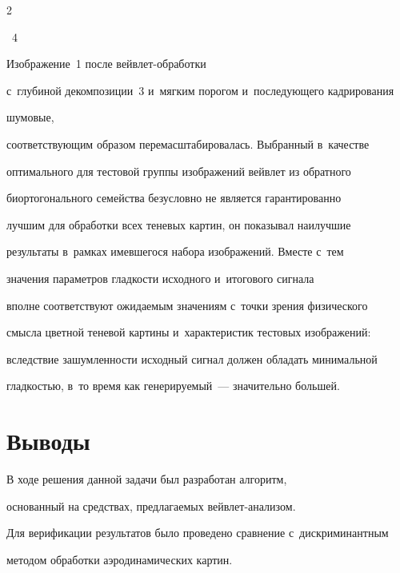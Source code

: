 \begin{multicols}{2}
\begin{center}
\end{center} 



\noindent

{{\figurename~4}\ \ \small{Изображение~1 после вейв\-лет-об\-ра\-бот\-ки 

с~глубиной декомпозиции~3 и~мягким порогом и~последующего кадрирования}}







 \vspace*{24pt}

 

 \addtocounter{figure}{1}

 

 \noindent

  шумовые, 

соответствующим образом перемасштабировалась. Выбранный в~качестве 

оптимального для тестовой группы изображений вейвлет из обратного 

биортогонального семейства безусловно не является гарантированно 

лучшим для обработки всех теневых картин, он показывал наилучшие 

результаты в~рамках имевшегося набора изображений. Вмес\-те с~тем 

значения параметров гладкости исходного и~итогового сигнала 

вполне соответствуют ожи\-да\-емым значениям с~точки зрения физического 

смыс\-ла цветной теневой картины и~характеристик тестовых изображений: 

вследствие зашумленности исходный сигнал должен обладать минимальной 

гладкостью, в~то время как генерируемый~--- значительно большей.



\section{Выводы}

В ходе решения данной задачи был разработан алгоритм, 

основанный на средствах, предлагаемых вейв\-лет-ана\-ли\-зом. 

Для верификации результатов было проведено сравнение с~дискриминантным 

методом обработки аэродинамических картин.




\end{multicols}
